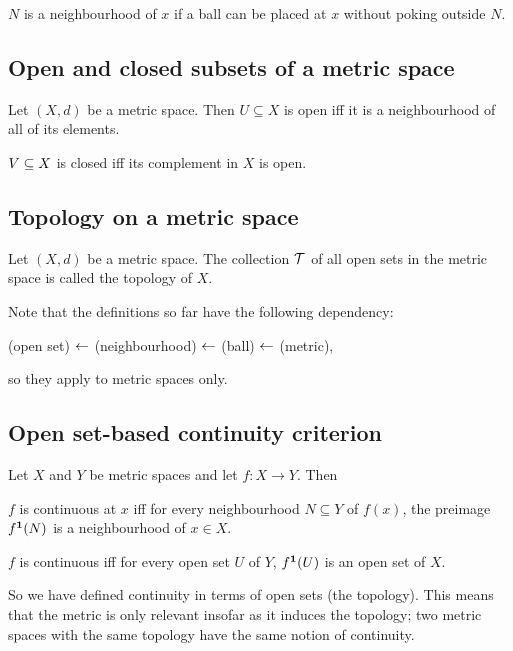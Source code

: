 \begin{remark*}
  $N$ is a neighbourhood of $x$ if a ball can be placed at $x$ without poking outside $N$.
\end{remark*}

\subsection{Open and closed subsets of a metric space}
\begin{definition}
  Let $(X, d)$ be a metric space. Then $U \subseteq X$ is open iff it is a neighbourhood of all of
  its elements.

  $V \subseteq X$ is closed iff its complement in $X$ is open.
\end{definition}

\subsection{Topology on a metric space}
\begin{definition}
  Let $(X, d)$ be a metric space. The collection $\mathcal T$ of all open sets in the metric space is
  called the topology of $X$.
\end{definition}

\begin{remark*}
  Note that the definitions so far have the following dependency:

  (open set) $\leftarrow$ (neighbourhood) $\leftarrow$ (ball) $\leftarrow$ (metric),

  so they apply to metric spaces only.
\end{remark*}

\subsection{Open set-based continuity criterion}
\begin{theorem}
  Let $X$ and $Y$ be metric spaces and let $f:X \to Y$. Then

  $f$ is continuous at $x$ iff for every neighbourhood $N \subseteq Y$ of $f(x)$, the preimage
  $f^{\mathbf 1}(N)$ is a neighbourhood of $x \in X$.

  $f$ is continuous iff for every open set $U$ of $Y$, $f^{\mathbf 1}(U)$ is an open set of $X$.
\end{theorem}

\begin{remark*}
  So we have defined continuity in terms of open sets (the topology). This means that the metric is
  only relevant insofar as it induces the topology; two metric spaces with the same topology have
  the same notion of continuity.
\end{remark*}

